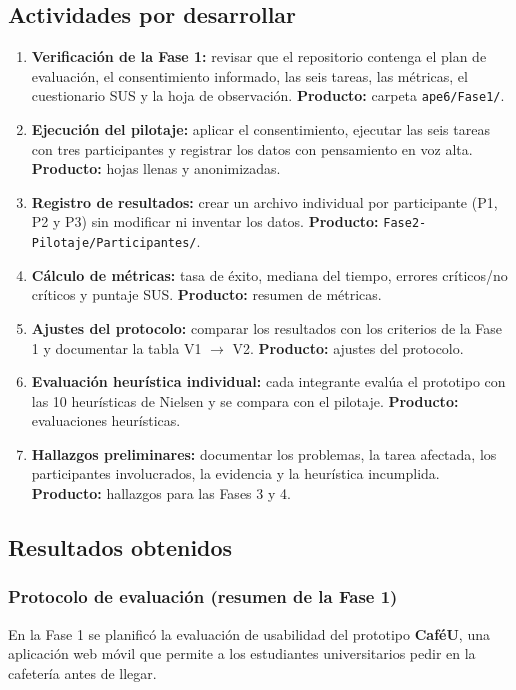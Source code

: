 \documentclass{article}
\begin{document}
\subsection{Actividades por desarrollar}
\begin{enumerate}[leftmargin=1.5em, itemsep=2pt]
    \item \textbf{Verificación de la Fase 1:} revisar que el repositorio contenga el plan de evaluación, el consentimiento informado, las seis tareas, las métricas, el cuestionario SUS y la hoja de observación. \textbf{Producto:} carpeta \texttt{ape6/Fase1/}.
    \item \textbf{Ejecución del pilotaje:} aplicar el consentimiento, ejecutar las seis tareas con tres participantes y registrar los datos con pensamiento en voz alta. \textbf{Producto:} hojas llenas y anonimizadas.
    \item \textbf{Registro de resultados:} crear un archivo individual por participante (P1, P2 y P3) sin modificar ni inventar los datos. \textbf{Producto:} \texttt{Fase2-Pilotaje/Participantes/}.
    \item \textbf{Cálculo de métricas:} tasa de éxito, mediana del tiempo, errores críticos/no críticos y puntaje SUS. \textbf{Producto:} resumen de métricas.
    \item \textbf{Ajustes del protocolo:} comparar los resultados con los criterios de la Fase 1 y documentar la tabla V1 $\rightarrow$ V2. \textbf{Producto:} ajustes del protocolo.
    \item \textbf{Evaluación heurística individual:} cada integrante evalúa el prototipo con las 10 heurísticas de Nielsen y se compara con el pilotaje. \textbf{Producto:} evaluaciones heurísticas.
    \item \textbf{Hallazgos preliminares:} documentar los problemas, la tarea afectada, los participantes involucrados, la evidencia y la heurística incumplida. \textbf{Producto:} hallazgos para las Fases 3 y 4.
\end{enumerate}

\subsection{Resultados obtenidos}

\subsubsection{Protocolo de evaluación (resumen de la Fase 1)}
En la Fase 1 se planificó la evaluación de usabilidad del prototipo \textbf{CaféU}, una aplicación web móvil que permite a los estudiantes universitarios pedir en la cafetería antes de llegar.
\end{document}
